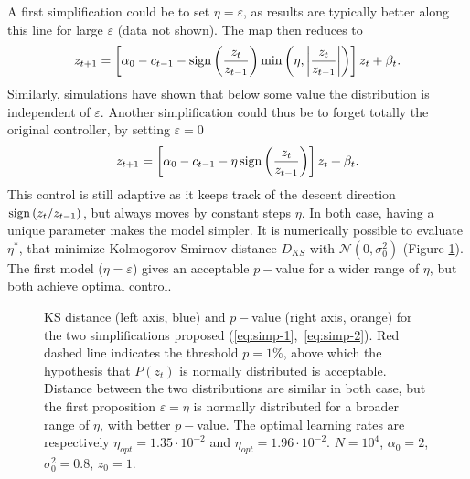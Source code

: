 \documentclass[FinalReport.tex]{subfiles}
\begin{document}
A first simplification could be to set $\eta=\varepsilon$, as results are typically better along this line for large $\varepsilon$ (data not shown). The map then reduces to
\begin{equation}\label{eq:simp-1}
		z_{t+1}=\left[\alpha_0-c_{t-1}-\text{sign}\left(\frac{z_t}{z_{t-1}}\right)\min\left(\eta,\abs{\frac{z_t}{z_{t-1}}}\right)\right] z_t + \beta_t.
\end{equation}
Similarly, simulations have shown that below some value the distribution is independent of $\varepsilon$. Another simplification could thus be to forget totally the original controller, by setting $\varepsilon=0$
\begin{equation}\label{eq:simp-2}
		z_{t+1}=\left[\alpha_0-c_{t-1}-\eta\,\text{sign}\left(\frac{z_t}{z_{t-1}}\right)\right] z_t + \beta_t.
\end{equation}
This control is still adaptive as it keeps track of the descent direction $\text{sign}\left(z_t/z_{t-1}\right)$, but always moves by constant steps $\eta$. In both case, having a unique parameter makes the model simpler. It is numerically possible to evaluate $\eta^*$, that minimize Kolmogorov-Smirnov distance $D_{KS}$ with $\mathcal{N}(0,\sigma_0^2)$ (Figure \ref{fig:special_cases}). The first model ($\eta=\varepsilon$) gives an acceptable $p-$value for a wider range of $\eta$, but both achieve optimal control.
\begin{figure}[h!]
\centering	
{}
\caption{KS distance (left axis, blue) and $p-$value (right axis, orange) for the two simplifications proposed (\ref{eq:simp-1},~\ref{eq:simp-2}). Red dashed line indicates the threshold $p=1\%$, above which the hypothesis that $P(z_t)$ is normally distributed is acceptable. Distance between the two distributions are similar in both case, but the first proposition $\varepsilon=\eta$ is normally distributed for a broader range of $\eta$, with better $p-$value. The optimal learning rates are respectively $\eta_{opt}=1.35\cdot10^{-2}$ and $\eta_{opt}=1.96\cdot10^{-2}$.
$N=10^4$, $\alpha_0=2$, $\sigma_0^2=0.8$, $z_0=1$.}
\label{fig:special_cases}	
\end{figure}
\end{document}
